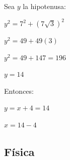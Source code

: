 \begin{enumerate}[resume]
	Sea $y$ la hipotenusa:
	
	$ y^2 = 7^2 + (7\sqrt{3})^2 $
	
	 $y^2 = 49 + 49(3)$ 
	 
	 $y^2 = 49 + 147 = 196 $
	 
	 $y = 14 $
	 
	Entonces:
	
	$ y = x + 4 = 14 $
	
	 $x = 14 - 4 $
	 
	
	\vspace{6mm}
	
\end{enumerate}






\subsection*{Física}

